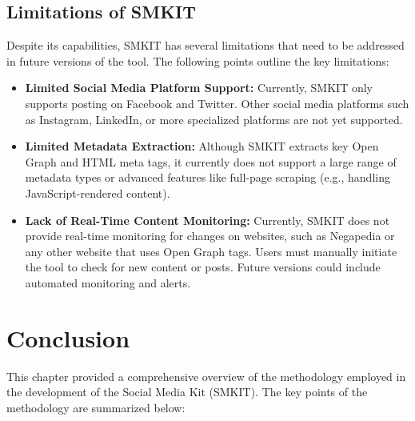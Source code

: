 \subsection{Limitations of SMKIT}
\label{subsec:limitations_of_smkit}
Despite its capabilities, SMKIT has several limitations that need to be addressed in future versions of the tool. The following points outline the key limitations:

\begin{itemize}
    \item \textbf{Limited Social Media Platform Support:} Currently, SMKIT only supports posting on Facebook and Twitter. Other social media platforms such as Instagram, LinkedIn, or more specialized platforms are not yet supported.
    
    \item \textbf{Limited Metadata Extraction:} Although SMKIT extracts key Open Graph and HTML meta tags, it currently does not support a large range of metadata types or advanced features like full-page scraping (e.g., handling JavaScript-rendered content).
    
    \item \textbf{Lack of Real-Time Content Monitoring:} Currently, SMKIT does not provide real-time monitoring for changes on websites, such as Negapedia or any other website that uses Open Graph tags. Users must manually initiate the tool to check for new content or posts. Future versions could include automated monitoring and alerts.
\end{itemize}


\section{Conclusion}
\label{sec:methodology_conclusion}
This chapter provided a comprehensive overview of the methodology employed in the development of the Social Media Kit (SMKIT). The key points of the methodology are summarized below:


